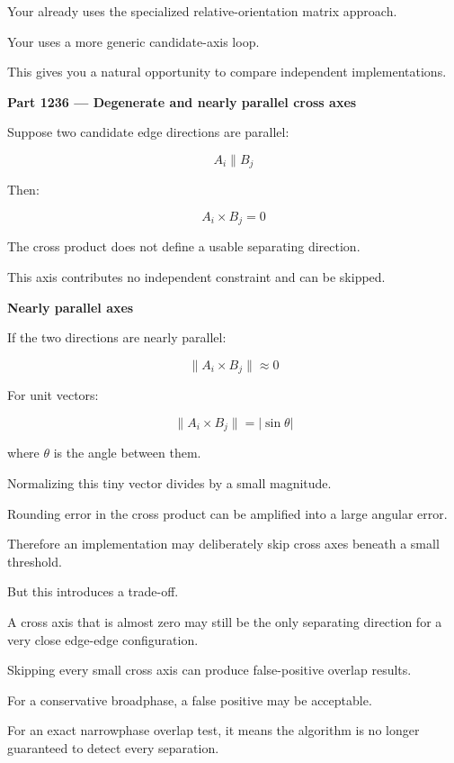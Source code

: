 Your  already uses the specialized relative-orientation matrix approach.

Your  uses a more generic candidate-axis loop.

This gives you a natural opportunity to compare independent implementations.

\textbf{Part 1236 --- Degenerate and nearly parallel cross axes}

Suppose two candidate edge directions are parallel:

\[
A_i\parallel B_j
\]

Then:

\[
\boxed{ A_i\times B_j=0 }
\]

The cross product does not define a usable separating direction.

This axis contributes no independent constraint and can be skipped.

\textbf{Nearly parallel axes}

If the two directions are nearly parallel:

\[
\|A_i\times B_j\|\approx0
\]

For unit vectors:

\[
\|A_i\times B_j\|=|\sin\theta|
\]

where \(\theta\) is the angle between them.

Normalizing this tiny vector divides by a small magnitude.

Rounding error in the cross product can be amplified into a large angular error.

Therefore an implementation may deliberately skip cross axes beneath a small threshold.

But this introduces a trade-off.

A cross axis that is almost zero may still be the only separating direction for a very close edge-edge configuration.

Skipping every small cross axis can produce false-positive overlap results.

For a conservative broadphase, a false positive may be acceptable.

For an exact narrowphase overlap test, it means the algorithm is no longer guaranteed to detect every separation.

